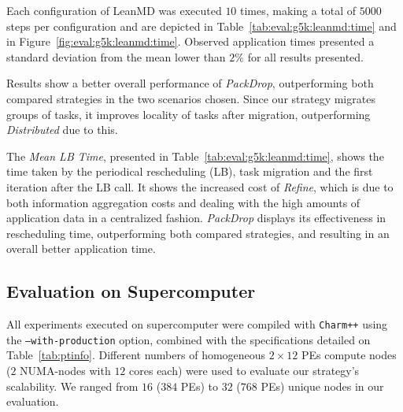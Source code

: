 


Each configuration of LeanMD was executed $10$ times, making a total of $5000$ steps per configuration and are depicted in Table~\ref{tab:eval:g5k:leanmd:time} and in Figure~\ref{fig:eval:g5k:leanmd:time}.
Observed application times presented a standard deviation from the mean lower than $2\%$ for all results presented.

Results show a better overall performance of \textit{PackDrop}, outperforming both compared strategies in the two scenarios chosen.
Since our strategy migrates groups of tasks, it improves locality of tasks after migration, outperforming \textit{Distributed} due to this.

The \textit{Mean LB Time}, presented in Table~\ref{tab:eval:g5k:leanmd:time}, shows the time taken by the periodical rescheduling (LB), task migration and the first iteration after the LB call.
It shows the increased cost of \textit{Refine}, which is due to both information aggregation costs and dealing with the high amounts of application data in a centralized fashion.
\textit{PackDrop} displays its effectiveness in rescheduling time, outperforming both compared strategies, and resulting in an overall better application time. 

\subsection{Evaluation on Supercomputer} \label{sec:sdumont}

All experiments executed on supercomputer were compiled with \texttt{Charm++} using the \texttt{--with-production} option, combined with the specifications detailed on Table~\ref{tab:ptinfo}.
Different numbers of homogeneous $2\times 12$ PEs compute nodes ($2$ NUMA-nodes with $12$ cores each) were used to evaluate our strategy's scalability.
We ranged from $16$ ($384$ PEs) to $32$ ($768$ PEs) unique nodes in our evaluation. 

